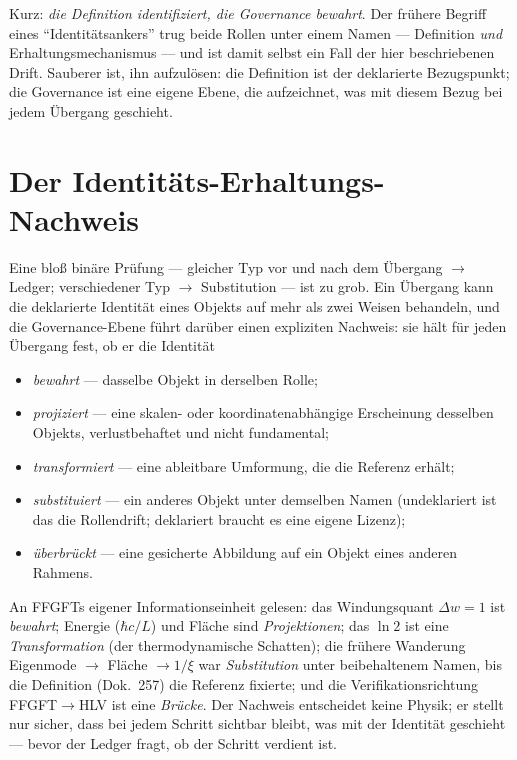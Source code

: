 Kurz: \emph{die Definition identifiziert, die Governance bewahrt}. Der frühere Begriff
eines \enquote{Identitätsankers} trug beide Rollen unter einem Namen --- Definition
\emph{und} Erhaltungsmechanismus --- und ist damit selbst ein Fall der hier beschriebenen
Drift. Sauberer ist, ihn aufzulösen: die Definition ist der deklarierte Bezugspunkt; die
Governance ist eine eigene Ebene, die aufzeichnet, was mit diesem Bezug bei jedem
Übergang geschieht.

\section{Der Identitäts-Erhaltungs-Nachweis}

Eine bloß binäre Prüfung --- gleicher Typ vor und nach dem Übergang $\to$ Ledger;
verschiedener Typ $\to$ Substitution --- ist zu grob. Ein Übergang kann die deklarierte
Identität eines Objekts auf mehr als zwei Weisen behandeln, und die Governance-Ebene
führt darüber einen expliziten Nachweis: sie hält für jeden Übergang fest, ob er die
Identität

\begin{itemize}
\item \emph{bewahrt} --- dasselbe Objekt in derselben Rolle;
\item \emph{projiziert} --- eine skalen- oder koordinatenabhängige Erscheinung desselben
Objekts, verlustbehaftet und nicht fundamental;
\item \emph{transformiert} --- eine ableitbare Umformung, die die Referenz erhält;
\item \emph{substituiert} --- ein anderes Objekt unter demselben Namen (undeklariert ist
das die Rollendrift; deklariert braucht es eine eigene Lizenz);
\item \emph{überbrückt} --- eine gesicherte Abbildung auf ein Objekt eines anderen
Rahmens.
\end{itemize}

An FFGFTs eigener Informationseinheit gelesen: das Windungsquant $\Delta w = 1$ ist
\emph{bewahrt}; Energie ($\hbar c/L$) und Fläche sind \emph{Projektionen}; das $\ln 2$
ist eine \emph{Transformation} (der thermodynamische Schatten); die frühere Wanderung
Eigenmode $\to$ Fläche $\to 1/\xi$ war \emph{Substitution} unter beibehaltenem Namen, bis
die Definition (Dok.~257) die Referenz fixierte; und die Verifikationsrichtung
FFGFT$\to$HLV ist eine \emph{Brücke}. Der Nachweis entscheidet keine Physik; er stellt
nur sicher, dass bei jedem Schritt sichtbar bleibt, was mit der Identität geschieht ---
bevor der Ledger fragt, ob der Schritt verdient ist.

